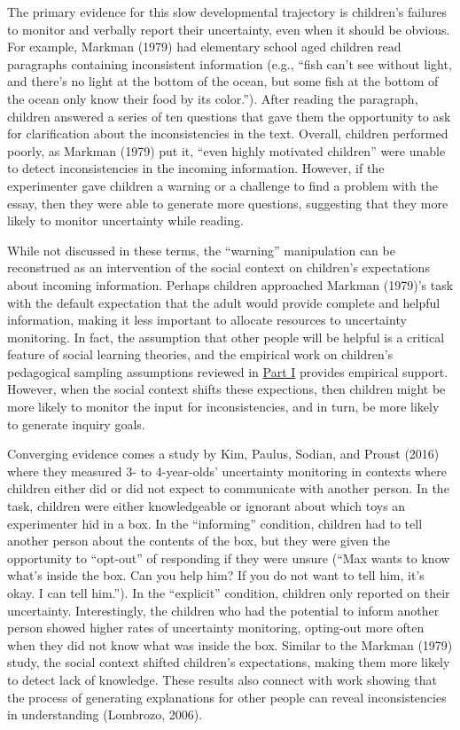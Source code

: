 \documentclass[english,floatsintext,man]{apa6}
\theoremstyle{definition}
\theoremstyle{definition}
\theoremstyle{definition}
\theoremstyle{remark}
\begin{document}
The primary evidence for this slow developmental trajectory is
children's failures to monitor and verbally report their uncertainty,
even when it should be obvious. For example, Markman (1979) had
elementary school aged children read paragraphs containing inconsistent
information (e.g., \enquote{fish can't see without light, and there's no
light at the bottom of the ocean, but some fish at the bottom of the
ocean only know their food by its color.}). After reading the paragraph,
children answered a series of ten questions that gave them the
opportunity to ask for clarification about the inconsistencies in the
text. Overall, children performed poorly, as Markman (1979) put it,
\enquote{even highly motivated children} were unable to detect
inconsistencies in the incoming information. However, if the
experimenter gave children a warning or a challenge to find a problem
with the essay, then they were able to generate more questions,
suggesting that they more likely to monitor uncertainty while reading.

While not discussed in these terms, the \enquote{warning} manipulation
can be reconstrued as an intervention of the social context on
children's expectations about incoming information. Perhaps children
approached Markman (1979)'s task with the default expectation that the
adult would provide complete and helpful information, making it less
important to allocate resources to uncertainty monitoring. In fact, the
assumption that other people will be helpful is a critical feature of
social learning theories, and the empirical work on children's
pedagogical sampling assumptions reviewed in \protect\hyperlink{p1}{Part
I} provides empirical support. However, when the social context shifts
these expections, then children might be more likely to monitor the
input for inconsistencies, and in turn, be more likely to generate
inquiry goals.

Converging evidence comes a study by Kim, Paulus, Sodian, and Proust
(2016) where they measured 3- to 4-year-olds' uncertainty monitoring in
contexts where children either did or did not expect to communicate with
another person. In the task, children were either knowledgeable or
ignorant about which toys an experimenter hid in a box. In the
\enquote{informing} condition, children had to tell another person about
the contents of the box, but they were given the opportunity to
\enquote{opt-out} of responding if they were unsure (\enquote{Max wants
to know what's inside the box. Can you help him? If you do not want to
tell him, it's okay. I can tell him.}). In the \enquote{explicit}
condition, children only reported on their uncertainty. Interestingly,
the children who had the potential to inform another person showed
higher rates of uncertainty monitoring, opting-out more often when they
did not know what was inside the box. Similar to the Markman (1979)
study, the social context shifted children's expectations, making them
more likely to detect lack of knowledge. These results also connect with
work showing that the process of generating explanations for other
people can reveal inconsistencies in understanding (Lombrozo, 2006).
\end{document}
